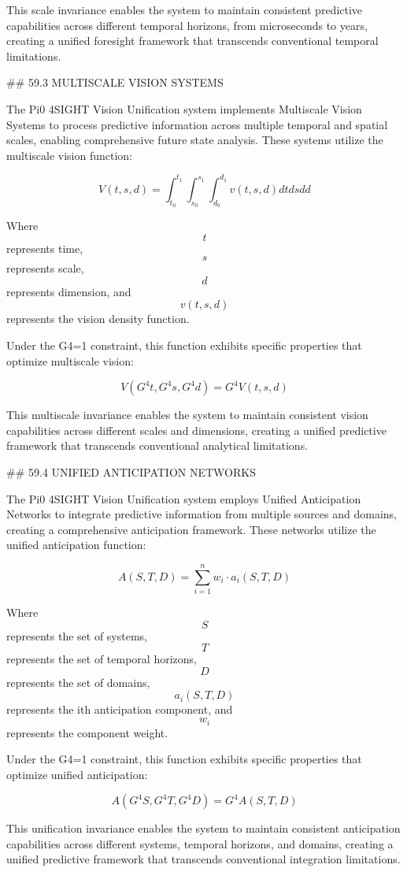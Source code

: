 This scale invariance enables the system to maintain consistent predictive capabilities across different temporal horizons, from microseconds to years, creating a unified foresight framework that transcends conventional temporal limitations.

## 59.3 MULTISCALE VISION SYSTEMS

The Pi0 4SIGHT Vision Unification system implements Multiscale Vision Systems to process predictive information across multiple temporal and spatial scales, enabling comprehensive future state analysis. These systems utilize the multiscale vision function:

$$ V(t, s, d) = \int_{t_0}^{t_1} \int_{s_0}^{s_1} \int_{d_0}^{d_1} v(t, s, d) dt ds dd $$

Where $$ t $$ represents time, $$ s $$ represents scale, $$ d $$ represents dimension, and $$ v(t, s, d) $$ represents the vision density function.

Under the G4=1 constraint, this function exhibits specific properties that optimize multiscale vision:

$$ V(G^4 t, G^4 s, G^4 d) = G^4 V(t, s, d) $$

This multiscale invariance enables the system to maintain consistent vision capabilities across different scales and dimensions, creating a unified predictive framework that transcends conventional analytical limitations.

## 59.4 UNIFIED ANTICIPATION NETWORKS

The Pi0 4SIGHT Vision Unification system employs Unified Anticipation Networks to integrate predictive information from multiple sources and domains, creating a comprehensive anticipation framework. These networks utilize the unified anticipation function:

$$ A(S, T, D) = \sum_{i=1}^{n} w_i \cdot a_i(S, T, D) $$

Where $$ S $$ represents the set of systems, $$ T $$ represents the set of temporal horizons, $$ D $$ represents the set of domains, $$ a_i(S, T, D) $$ represents the ith anticipation component, and $$ w_i $$ represents the component weight.

Under the G4=1 constraint, this function exhibits specific properties that optimize unified anticipation:

$$ A(G^4 S, G^4 T, G^4 D) = G^4 A(S, T, D) $$

This unification invariance enables the system to maintain consistent anticipation capabilities across different systems, temporal horizons, and domains, creating a unified predictive framework that transcends conventional integration limitations.

